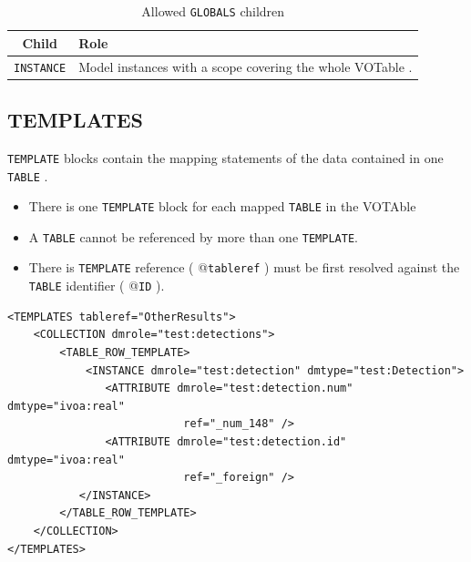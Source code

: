 \documentclass[11pt,a4paper]{ivoa}
\begin{document}
\begin{table}[hbtp]
\small
\centering
\begin{tabulary}{\linewidth}{|c|J|}       
       \hline 
           \textbf{Child} &  
           \textbf{Role}\\
       \hline         \hline  
            \texttt{INSTANCE}    &  
            Model instances with a scope covering the whole VOTable . \\       
       \hline 
     \end{tabulary}
     \caption{Allowed  \texttt{GLOBALS} children} 
     \label{tbl:globals-children}
 \end{table}


%
%
\subsection{TEMPLATES}

\texttt{TEMPLATE} blocks contain the mapping statements of the data contained in one \texttt{TABLE} .

\begin{itemize}
    \item There is one \texttt{TEMPLATE} block for each mapped \texttt{TABLE}  in the VOTAble    
    \item A \texttt{TABLE} cannot be referenced by more than one \texttt{TEMPLATE}.
    \item  There is \texttt{TEMPLATE} reference ( @\texttt{tableref} ) must be first resolved against the \texttt{TABLE} identifier (  @\texttt{ID} ).
\end{itemize}

\begin{lstlisting}[caption={GLOBALS block example},style=XML]
<TEMPLATES tableref="OtherResults">
    <COLLECTION dmrole="test:detections">
        <TABLE_ROW_TEMPLATE>
            <INSTANCE dmrole="test:detection" dmtype="test:Detection">
               <ATTRIBUTE dmrole="test:detection.num" dmtype="ivoa:real"
                           ref="_num_148" />
               <ATTRIBUTE dmrole="test:detection.id" dmtype="ivoa:real"
                           ref="_foreign" />
           </INSTANCE>
        </TABLE_ROW_TEMPLATE>
    </COLLECTION>
</TEMPLATES>
\end{lstlisting}
\end{document}
